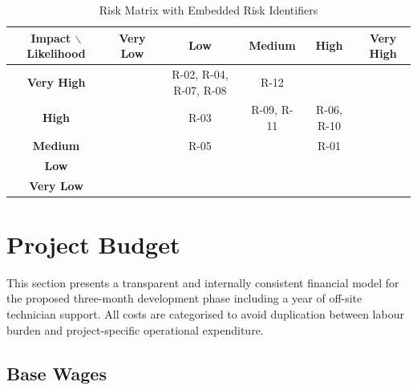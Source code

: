 \documentclass{article}
\begin{document}
\begin{table}[h]
\centering
\renewcommand{\arraystretch}{1.6}
\begin{tabular}{|c|c|c|c|c|c|}
\hline
\textbf{Impact} $\backslash$ \textbf{Likelihood}
& \textbf{Very Low}
& \textbf{Low}
& \textbf{Medium}
& \textbf{High}
& \textbf{Very High} \\
\hline
\textbf{Very High}
& \cellcolor{yellow!40}
& \cellcolor{orange!50} R-02, R-04, R-07, R-08
& \cellcolor{red!60} R-12
& \cellcolor{red!80}
& \cellcolor{red!90} \\
\hline
\textbf{High}
& \cellcolor{yellow!30}
& \cellcolor{yellow!60} R-03
& \cellcolor{orange!60} R-09, R-11
& \cellcolor{red!70} R-06, R-10
& \cellcolor{red!80} \\
\hline
\textbf{Medium}
& \cellcolor{green!30}
& \cellcolor{yellow!30} R-05
& \cellcolor{yellow!50}
& \cellcolor{orange!60} R-01
& \cellcolor{red!70} \\
\hline
\textbf{Low}
& \cellcolor{green!20}
& \cellcolor{green!30}
& \cellcolor{yellow!30}
& \cellcolor{yellow!50}
& \cellcolor{orange!60} \\
\hline
\textbf{Very Low}
& \cellcolor{green!10}
& \cellcolor{green!20}
& \cellcolor{green!30}
& \cellcolor{yellow!30}
& \cellcolor{yellow!40} \\
\hline
\end{tabular}
\caption{Risk Matrix with Embedded Risk Identifiers}
\end{table}


\section{Project Budget}

This section presents a transparent and internally consistent financial 
model for the proposed three-month development phase including a year of off-site technician support. All costs are categorised to avoid duplication between labour burden and project-specific operational expenditure.


\subsection{Base Wages}
\end{document}
